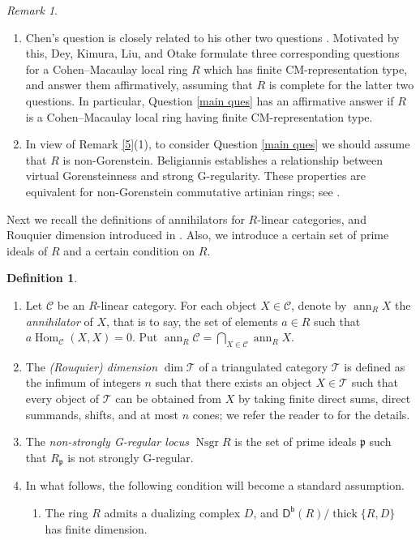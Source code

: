 \documentclass{amsart}
\theoremstyle{definition}
\newtheorem{dfn}[thm]{Definition}
\theoremstyle{remark}
\newtheorem{rem}[thm]{Remark}
\numberwithin{equation}{thm}
\def\ann{\operatorname{ann}}
\def\C{\mathcal{C}}
\def\Db{\operatorname{\mathsf{D^b}}}
\def\Hom{\operatorname{Hom}}
\def\nsgr{\operatorname{Nsgr}}
\def\p{\mathfrak{p}}
\def\T{\mathcal{T}}
\def\thick{\operatorname{thick}}
\begin{document}
\begin{rem}
\begin{enumerate}[(1)]
\item
Chen's question \cite[Problem C]{Che17} is closely related to his other two questions \cite[Problems A and B]{Che17}. 
Motivated by this, Dey, Kimura, Liu, and Otake \cite{DKLO25} formulate three corresponding questions for a Cohen--Macaulay local ring $R$ which has finite CM-representation type, and answer them affirmatively, assuming that $R$ is complete for the latter two questions.
In particular, Question \ref{main ques} has an affirmative answer if $R$ is a Cohen--Macaulay local ring having finite CM-representation type.
\item
In view of Remark \ref{5}(1), to consider Question \ref{main ques} we should assume that $R$ is non-Gorenstein.
Beligiannis \cite{B98} establishes a relationship between virtual Gorensteinness and strong G-regularity.
These properties are equivalent for non-Gorenstein commutative artinian rings; see \cite[Corollary 5.12]{DKLO25}.
\end{enumerate}
\end{rem}

Next we recall the definitions of annihilators for $R$-linear categories, and Rouquier dimension introduced in \cite{R08}.
Also, we introduce a certain set of prime ideals of $R$ and a certain condition on $R$.

\begin{dfn}
\begin{enumerate}[(1)]
\item
Let $\C$ be an $R$-linear category.
For each object $X\in\C$, denote by $\ann_R X$ the {\em annihilator} of $X$, that is to say, the set of elements $a\in R$ such that $a\Hom_\C(X,X)=0$.
Put $\ann_R \C=\bigcap_{X\in\C} \ann_R X$.
\item
The {\em (Rouquier) dimension} $\dim \T$ of a triangulated category $\T$ is defined as the infimum of integers $n$ such that there exists an object $X\in \T$ such that every object of $\T$ can be obtained from $X$ by taking finite direct sums, direct summands, shifts, and at most $n$ cones; we refer the reader to \cite{R08} for the details.
\item
The \textit{non-strongly G-regular locus} $\nsgr R$ is the set of prime ideals $\p$ such that $R_\p$ is not strongly G-regular.
\item
In what follows, the following condition will become a standard assumption.
\begin{enumerate}
\item[$(\#)$]
The ring $R$ admits a dualizing complex $D$, and $\Db(R)/\thick\{R, D\}$ has finite dimension.
\end{enumerate}
\end{enumerate}	
\end{dfn}
\end{document}

